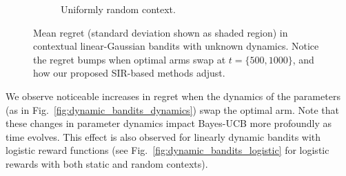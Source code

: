 \documentclass{article}
\begin{document}
\begin{figure}[!h]
\begin{subfigure}[b]{0.49\textwidth}
		\caption{Uniformly random context.}
		\label{fig:dynamic_bandits_linearGaussian_crand_dunknown}
	\end{subfigure}
	\caption{Mean regret (standard deviation shown as shaded region) in contextual linear-Gaussian bandits with unknown dynamics. Notice the regret bumps when optimal arms swap at $t=\{500, 1000\}$, and how our proposed SIR-based methods adjust.}
	\label{fig:dynamic_bandits_linearGaussian_dunknown}
\end{figure}

We observe noticeable increases in regret when the dynamics of the parameters (as in Fig.~\ref{fig:dynamic_bandits_dynamics}) swap the optimal arm. Note that these changes in parameter dynamics impact Bayes-UCB more profoundly as time evolves. This effect is also observed for linearly dynamic bandits with logistic reward functions (see Fig.~\ref{fig:dynamic_bandits_logistic} for logistic rewards with both static and random contexts).
\end{document}
